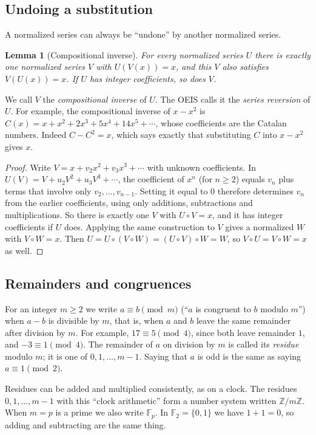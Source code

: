 \documentclass[11pt,a4paper]{article}
\newtheorem{lemma}[theorem]{Lemma}
\theoremstyle{definition}
\theoremstyle{remark}
\newcommand{\Z}{\mathbb{Z}}
\newcommand{\F}{\mathbb{F}}
\begin{document}
\subsection{Undoing a substitution}
A normalized series can always be ``undone'' by another normalized series.

\begin{lemma}[Compositional inverse]\label{lem:inverse}
For every normalized series $U$ there is exactly one normalized series $V$ with $U(V(x))=x$, and this $V$ also
satisfies $V(U(x))=x$. If $U$ has integer coefficients, so does $V$.
\end{lemma}

We call $V$ the \emph{compositional inverse} of $U$. The OEIS calls it the \emph{series reversion} of $U$. For example,
the compositional inverse of $x-x^2$ is $C(x)=x+x^2+2x^3+5x^4+14x^5+\cdots$, whose coefficients are the Catalan numbers.
Indeed $C-C^2=x$, which says exactly that substituting $C$ into $x-x^2$ gives $x$.

\begin{proof}
Write $V=x+v_2x^2+v_3x^3+\cdots$ with unknown coefficients. In
$U(V)=V+u_2V^2+u_3V^3+\cdots$, the coefficient of $x^n$ (for $n\ge2$) equals $v_n$ plus terms that involve only
$v_2,\dots,v_{n-1}$. Setting it equal to $0$ therefore determines $v_n$ from the earlier coefficients, using only
additions, subtractions and multiplications. So there is exactly one $V$ with $U\circ V=x$, and it has integer
coefficients if $U$ does. Applying the same construction to $V$ gives a normalized $W$ with $V\circ W=x$. Then
$U=U\circ(V\circ W)=(U\circ V)\circ W=W$, so $V\circ U=V\circ W=x$ as well.
\end{proof}

\subsection{Remainders and congruences}
For an integer $m\ge2$ we write $a\equiv b\pmod m$ (``$a$ is congruent to $b$ modulo $m$'') when $a-b$ is divisible by
$m$, that is, when $a$ and $b$ leave the same remainder after division by $m$. For example, $17\equiv5\pmod 4$, since both leave remainder $1$, and $-3\equiv1\pmod4$. The
remainder of $a$ on division by $m$ is called its \emph{residue} modulo $m$; it is one of $0,1,\dots,m-1$. Saying that
$a$ is odd is the same as saying $a\equiv1\pmod2$.

Residues can be added and multiplied consistently, as on a clock. The residues $0,1,\dots,m-1$ with this ``clock
arithmetic'' form a number system written $\Z/m\Z$. When $m=p$ is a prime we also write $\F_p$. In $\F_2=\{0,1\}$ we
have $1+1=0$, so adding and subtracting are the same thing.
\end{document}
